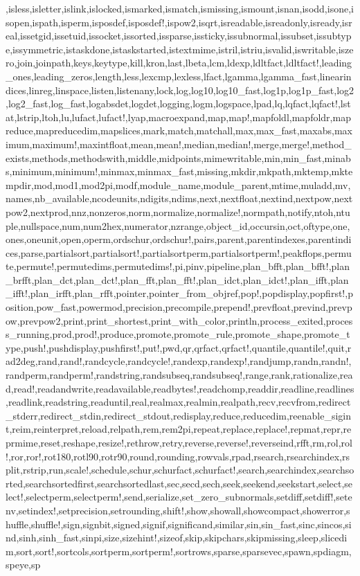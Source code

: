 {,isless,isletter,islink,islocked,ismarked,ismatch,ismissing,ismount,isnan,isodd,isone,isopen,ispath,isperm,isposdef,isposdef!,ispow2,isqrt,isreadable,isreadonly,isready,isreal,issetgid,issetuid,issocket,issorted,issparse,issticky,issubnormal,issubset,issubtype,issymmetric,istaskdone,istaskstarted,istextmime,istril,istriu,isvalid,iswritable,iszero,join,joinpath,keys,keytype,kill,kron,last,lbeta,lcm,ldexp,ldltfact,ldltfact!,leading_ones,leading_zeros,length,less,lexcmp,lexless,lfact,lgamma,lgamma_fast,linearindices,linreg,linspace,listen,listenany,lock,log,log10,log10_fast,log1p,log1p_fast,log2,log2_fast,log_fast,logabsdet,logdet,logging,logm,logspace,lpad,lq,lqfact,lqfact!,lstat,lstrip,ltoh,lu,lufact,lufact!,lyap,macroexpand,map,map!,mapfoldl,mapfoldr,mapreduce,mapreducedim,mapslices,mark,match,matchall,max,max_fast,maxabs,maximum,maximum!,maxintfloat,mean,mean!,median,median!,merge,merge!,method_exists,methods,methodswith,middle,midpoints,mimewritable,min,min_fast,minabs,minimum,minimum!,minmax,minmax_fast,missing,mkdir,mkpath,mktemp,mktempdir,mod,mod1,mod2pi,modf,module_name,module_parent,mtime,muladd,mv,names,nb_available,ncodeunits,ndigits,ndims,next,nextfloat,nextind,nextpow,nextpow2,nextprod,nnz,nonzeros,norm,normalize,normalize!,normpath,notify,ntoh,ntuple,nullspace,num,num2hex,numerator,nzrange,object_id,occursin,oct,oftype,one,ones,oneunit,open,operm,ordschur,ordschur!,pairs,parent,parentindexes,parentindices,parse,partialsort,partialsort!,partialsortperm,partialsortperm!,peakflops,permute,permute!,permutedims,permutedims!,pi,pinv,pipeline,plan_bfft,plan_bfft!,plan_brfft,plan_dct,plan_dct!,plan_fft,plan_fft!,plan_idct,plan_idct!,plan_ifft,plan_ifft!,plan_irfft,plan_rfft,pointer,pointer_from_objref,pop!,popdisplay,popfirst!,position,pow_fast,powermod,precision,precompile,prepend!,prevfloat,prevind,prevpow,prevpow2,print,print_shortest,print_with_color,println,process_exited,process_running,prod,prod!,produce,promote,promote_rule,promote_shape,promote_type,push!,pushdisplay,pushfirst!,put!,pwd,qr,qrfact,qrfact!,quantile,quantile!,quit,rad2deg,rand,rand!,randcycle,randcycle!,randexp,randexp!,randjump,randn,randn!,randperm,randperm!,randstring,randsubseq,randsubseq!,range,rank,rationalize,read,read!,readandwrite,readavailable,readbytes!,readchomp,readdir,readline,readlines,readlink,readstring,readuntil,real,realmax,realmin,realpath,recv,recvfrom,redirect_stderr,redirect_stdin,redirect_stdout,redisplay,reduce,reducedim,reenable_sigint,reim,reinterpret,reload,relpath,rem,rem2pi,repeat,replace,replace!,repmat,repr,reprmime,reset,reshape,resize!,rethrow,retry,reverse,reverse!,reverseind,rfft,rm,rol,rol!,ror,ror!,rot180,rotl90,rotr90,round,rounding,rowvals,rpad,rsearch,rsearchindex,rsplit,rstrip,run,scale!,schedule,schur,schurfact,schurfact!,search,searchindex,searchsorted,searchsortedfirst,searchsortedlast,sec,secd,sech,seek,seekend,seekstart,select,select!,selectperm,selectperm!,send,serialize,set_zero_subnormals,setdiff,setdiff!,setenv,setindex!,setprecision,setrounding,shift!,show,showall,showcompact,showerror,shuffle,shuffle!,sign,signbit,signed,signif,significand,similar,sin,sin_fast,sinc,sincos,sind,sinh,sinh_fast,sinpi,size,sizehint!,sizeof,skip,skipchars,skipmissing,sleep,slicedim,sort,sort!,sortcols,sortperm,sortperm!,sortrows,sparse,sparsevec,spawn,spdiagm,speye,sp}
